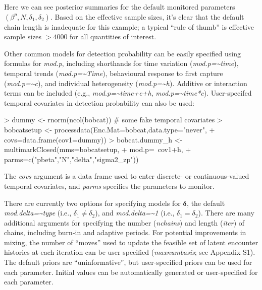 \documentclass[12pt]{article}
\begin{document}
Here we can see posterior summaries for the default monitored parameters $(\beta^p, N, \delta_1, \delta_2)$. Based on the effective sample sizes, it's clear that the default chain length is inadequate for this example; a typical ``rule of thumb'' is effective sample sizes $>4000$ for all quantities of interest.

Other common models for detection probability can be easily specified using formulas for \textit{mod.p}, including shorthands for time variation (\textit{mod.p={\textasciitilde{}}time}), temporal trends (\textit{mod.p={\textasciitilde{}}Time}), behavioural response to first capture (\textit{mod.p={\textasciitilde{}}c}), and individual heterogeneity (\textit{mod.p={\textasciitilde{}}h}). Additive or interaction terms can be included (e.g., \textit{mod.p={\textasciitilde{}}time+c+h}, \textit{mod.p={\textasciitilde{}}time*c}). User-specifed temporal covariates in detection probability can also be used: 
\begin{Schunk}
\begin{Sinput}
> dummy <- rnorm(ncol(bobcat)) # some fake temporal covariates
> bobcatsetup <- processdata(Enc.Mat=bobcat,data.type="never",
+                     covs=data.frame(cov1=dummy))
> bobcat.dummy_h <- multimarkClosed(mms=bobcatsetup,
+                     mod.p=~cov1+h,
+                     parms=c("pbeta","N","delta","sigma2_zp"))
\end{Sinput}
\end{Schunk}
The \textit{covs} argument is a data frame used to enter discrete- or continuous-valued temporal covariates, and \textit{parms} specifies the parameters to monitor. 

There are currently two options for specifying models for ${\boldsymbol \delta}$, the default \textit{mod.delta={\textasciitilde{}}type} (i.e., $\delta_1 \ne \delta_2$), and \textit{mod.delta={\textasciitilde{}}1} (i.e., $\delta_1 = \delta_2$). There are many additional arguments for specifying the number (\textit{nchains}) and length (\textit{iter}) of chains, including burn-in and adaptive periods. For potential improvements in mixing, the number of ``moves'' used to  update the feasible set of latent encounter histories at each iteration can be user specified (\textit{maxnumbasis}; see Appendix S1). The default priors are ``uninformative'', but user-specified priors can be used for each parameter. Initial values can be automatically generated or user-specified for each parameter.
\end{document}
